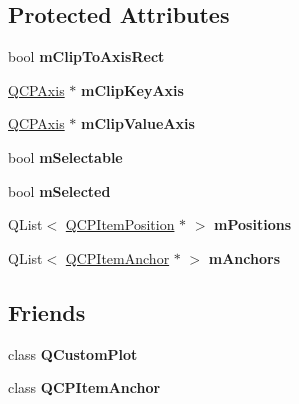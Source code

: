 \subsection*{Protected Attributes}
\begin{DoxyCompactItemize}
\item 
\hypertarget{classQCPAbstractItem_ad2a70ff6b658fcb84a9427f69d3f587d}{bool {\bfseries m\-Clip\-To\-Axis\-Rect}}\label{classQCPAbstractItem_ad2a70ff6b658fcb84a9427f69d3f587d}

\item 
\hypertarget{classQCPAbstractItem_aa789a7e04cef1f8291409eef58068518}{\hyperlink{classQCPAxis}{Q\-C\-P\-Axis} $\ast$ {\bfseries m\-Clip\-Key\-Axis}}\label{classQCPAbstractItem_aa789a7e04cef1f8291409eef58068518}

\item 
\hypertarget{classQCPAbstractItem_a5305649de1638fcd59b4356f101d81a9}{\hyperlink{classQCPAxis}{Q\-C\-P\-Axis} $\ast$ {\bfseries m\-Clip\-Value\-Axis}}\label{classQCPAbstractItem_a5305649de1638fcd59b4356f101d81a9}

\item 
\hypertarget{classQCPAbstractItem_ad81eb35c8726a0f458db9df9732e0e41}{bool {\bfseries m\-Selectable}}\label{classQCPAbstractItem_ad81eb35c8726a0f458db9df9732e0e41}

\item 
\hypertarget{classQCPAbstractItem_a4bdb3457dad1d268c0f78a44152b9645}{bool {\bfseries m\-Selected}}\label{classQCPAbstractItem_a4bdb3457dad1d268c0f78a44152b9645}

\item 
\hypertarget{classQCPAbstractItem_af94ff71b6a15ea6d028ab8bd8eccd012}{Q\-List$<$ \hyperlink{classQCPItemPosition}{Q\-C\-P\-Item\-Position} $\ast$ $>$ {\bfseries m\-Positions}}\label{classQCPAbstractItem_af94ff71b6a15ea6d028ab8bd8eccd012}

\item 
\hypertarget{classQCPAbstractItem_a909a3abab783de302ebf0a0e6f2bbc15}{Q\-List$<$ \hyperlink{classQCPItemAnchor}{Q\-C\-P\-Item\-Anchor} $\ast$ $>$ {\bfseries m\-Anchors}}\label{classQCPAbstractItem_a909a3abab783de302ebf0a0e6f2bbc15}

\end{DoxyCompactItemize}
\subsection*{Friends}
\begin{DoxyCompactItemize}
\item 
\hypertarget{classQCPAbstractItem_a1cdf9df76adcfae45261690aa0ca2198}{class {\bfseries Q\-Custom\-Plot}}\label{classQCPAbstractItem_a1cdf9df76adcfae45261690aa0ca2198}

\item 
\hypertarget{classQCPAbstractItem_a61767d414fd57af9eb1741b34268c7fc}{class {\bfseries Q\-C\-P\-Item\-Anchor}}\label{classQCPAbstractItem_a61767d414fd57af9eb1741b34268c7fc}

\end{DoxyCompactItemize}



